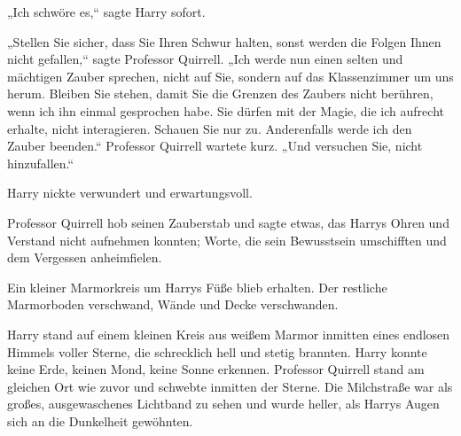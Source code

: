 „Ich schwöre es,“ sagte Harry sofort.

„Stellen Sie sicher, dass Sie Ihren Schwur halten, sonst werden die Folgen Ihnen nicht gefallen,“ sagte Professor Quirrell. „Ich werde nun einen selten und mächtigen Zauber sprechen, nicht auf Sie, sondern auf das Klassenzimmer um uns herum. Bleiben Sie stehen, damit Sie die Grenzen des Zaubers nicht berühren, wenn ich ihn einmal gesprochen habe. Sie dürfen mit der Magie, die ich aufrecht erhalte, nicht interagieren. Schauen Sie nur zu. Anderenfalls werde ich den Zauber beenden.“ Professor Quirrell wartete kurz. „Und versuchen Sie, nicht hinzufallen.“

Harry nickte verwundert und erwartungsvoll.

Professor Quirrell hob seinen Zauberstab und sagte etwas, das Harrys Ohren und Verstand nicht aufnehmen konnten; Worte, die sein Bewusstsein umschifften und dem Vergessen anheimfielen.

Ein kleiner Marmorkreis um Harrys Füße blieb erhalten. Der restliche Marmorboden verschwand, Wände und Decke verschwanden.

Harry stand auf einem kleinen Kreis aus weißem Marmor inmitten eines endlosen Himmels voller Sterne, die schrecklich hell und stetig brannten. Harry konnte keine Erde, keinen Mond, keine Sonne erkennen. Professor Quirrell stand am gleichen Ort wie zuvor und schwebte inmitten der Sterne. Die Milchstraße war als großes, ausgewaschenes Lichtband zu sehen und wurde heller, als Harrys Augen sich an die Dunkelheit gewöhnten.

